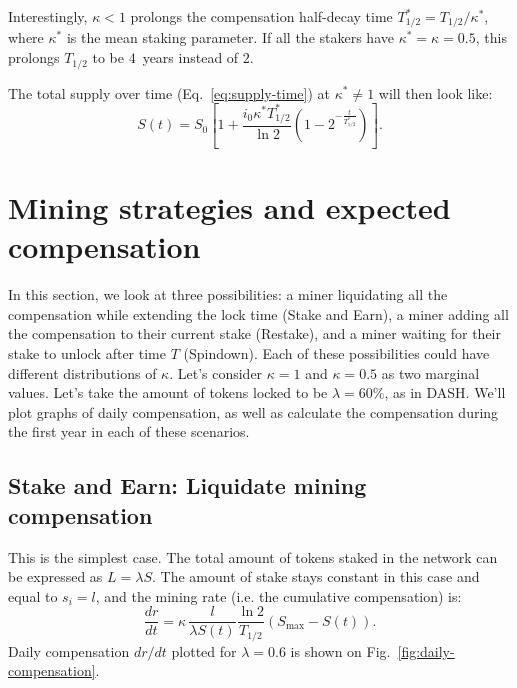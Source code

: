 \documentclass[longbibliography,nofootinbib,twocolumn]{revtex4-1}
\newcommand{\figref}[1]{Fig.~\ref{#1}}
\begin{document}
Interestingly, $\kappa < 1$ prolongs the compensation half-decay time $T_{1/2}^* = T_{1/2} / \kappa^*$, where $\kappa^*$ is the mean staking parameter.
If all the stakers have $\kappa^* = \kappa = 0.5$, this prolongs $T_{1/2}$ to be $4$~years instead of $2$.

The total supply over time (Eq.~\ref{eq:supply-time}) at $\kappa^* \ne 1$ will then look like:
\begin{equation}
    \label{eq:adjusted-supply-time}
    S(t) = S_0 \left[1 + \frac{i_0 \kappa^* T_{1/2}^*}{\ln{2}}\left(1 - 2^{-\frac{t}{T_{1/2}^*}} \right) \right].
\end{equation}

\section{Mining strategies and expected compensation}

In this section, we look at three possibilities:
a miner liquidating all the compensation while extending the lock time (Stake and Earn),
a miner adding all the compensation to their current stake (Restake),
and a miner waiting for their stake to unlock after time $T$ (Spindown).
Each of these possibilities could have different distributions of $\kappa$.
Let's consider $\kappa=1$ and $\kappa=0.5$ as two marginal values.
Let's take the amount of tokens locked to be $\lambda=60\%$, as in DASH.
We'll plot graphs of daily compensation, as well as calculate the compensation during the first year in each of these scenarios.

\subsection{Stake and Earn: Liquidate mining compensation}

This is the simplest case.
The total amount of tokens staked in the network can be expressed as $L=\lambda S$.
The amount of stake stays constant in this case and equal to $s_i = l$, and the mining rate (i.e. the cumulative compensation) is:
\begin{equation}
    \frac{dr}{dt} =  \kappa\, \frac{l}{\lambda S(t)} \frac{\ln{2}}{T_{1/2}} \left( S_{\max} - S(t)\right).
\end{equation}
Daily compensation $dr/dt$ plotted for $\lambda=0.6$ is shown on \figref{fig:daily-compensation}.
\end{document}
